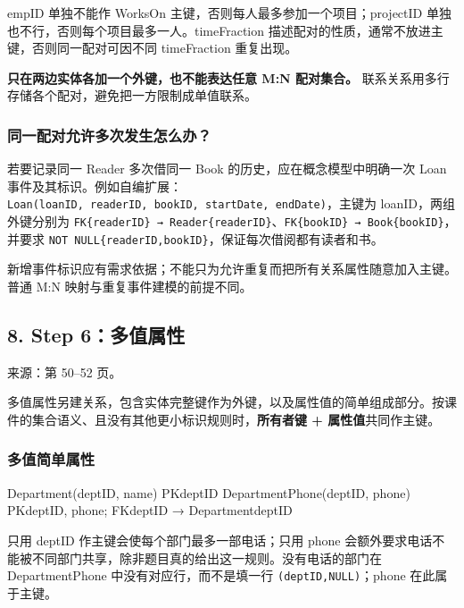 empID 单独不能作 WorksOn 主键，否则每人最多参加一个项目；projectID 单独也不行，否则每个项目最多一人。timeFraction 描述配对的性质，通常不放进主键，否则同一配对可因不同 timeFraction 重复出现。

\textbf{只在两边实体各加一个外键，也不能表达任意 M:N 配对集合。} 联系关系用多行存储各个配对，避免把一方限制成单值联系。

\subsubsection{同一配对允许多次发生怎么办？}\label{04_er_to_relational_mapping_zh-ux540cux4e00ux914dux5bf9ux5141ux8bb8ux591aux6b21ux53d1ux751fux600eux4e48ux529e}

若要记录同一 Reader 多次借同一 Book 的历史，应在概念模型中明确一次 Loan 事件及其标识。例如自编扩展：\texttt{Loan(\allowbreak{}loanID,\allowbreak{}\ readerID,\allowbreak{}\ bookID,\allowbreak{}\ startDate,\allowbreak{}\ endDate)\allowbreak{}}，主键为 loanID，两组外键分别为 \texttt{FK\{readerID\}\ →\ Reader\{readerID\}}、\texttt{FK\{bookID\}\ →\ Book\{bookID\}}，并要求 \texttt{NOT\ NULL\{readerID,bookID\}}，保证每次借阅都有读者和书。

新增事件标识应有需求依据；不能只为允许重复而把所有关系属性随意加入主键。普通 M:N 映射与重复事件建模的前提不同。

\subsection{8. Step 6：多值属性}\label{04_er_to_relational_mapping_zh-step-6ux591aux503cux5c5eux6027}

来源：第 50--52 页。

多值属性另建关系，包含实体完整键作为外键，以及属性值的简单组成部分。按课件的集合语义、且没有其他更小标识规则时，\textbf{所有者键 + 属性值}共同作主键。

\subsubsection{多值简单属性}\label{04_er_to_relational_mapping_zh-ux591aux503cux7b80ux5355ux5c5eux6027}

\begin{StudyCode}
Department(deptID, name)                   PK{deptID}
DepartmentPhone(deptID, phone)
  PK{deptID, phone}; FK{deptID} → Department{deptID}
\end{StudyCode}

只用 deptID 作主键会使每个部门最多一部电话；只用 phone 会额外要求电话不能被不同部门共享，除非题目真的给出这一规则。没有电话的部门在 DepartmentPhone 中没有对应行，而不是填一行 \texttt{(\allowbreak{}deptID,\allowbreak{}NULL)\allowbreak{}}；phone 在此属于主键。

